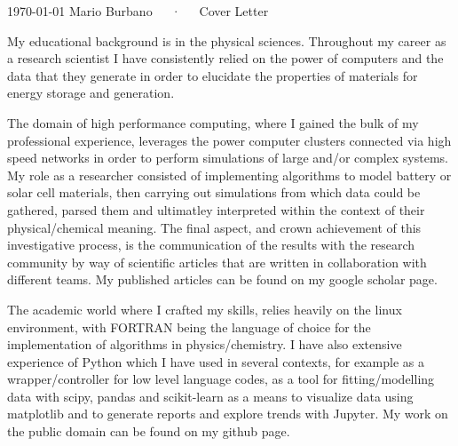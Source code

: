 \documentclass[11pt, a4paper]{awesome-cv}
\begin{document}
\makecvheader[R]

\makecvfooter
  {\today}
  {Mario Burbano~~~·~~~Cover Letter}
  {}

\makelettertitle

\begin{cvletter}


My educational background is in the physical sciences. Throughout my career as a research scientist I have consistently relied on the power of computers and the data that they generate in order to elucidate the properties of materials for energy storage and generation.

The domain of high performance computing, where I gained the bulk of my professional experience, leverages the power computer clusters connected via high speed networks in order to perform simulations of large and/or complex systems. My role as a researcher consisted of implementing algorithms to model battery or solar cell materials, then carrying out simulations from which data could be gathered, parsed them and ultimatley interpreted within the context of their physical/chemical meaning. The final aspect, and crown achievement of this investigative process, is the communication of the results with the research community by way of scientific articles that are written in collaboration with different teams. My published articles can be found on my google scholar page.  

The academic world where I crafted my skills, relies heavily on the linux environment, with FORTRAN being the language of choice for the implementation of algorithms in physics/chemistry. I have also extensive experience of Python which I have used in several contexts, for example as a wrapper/controller for low level language codes, as a tool for fitting/modelling data with scipy, pandas and scikit-learn as a means to visualize data using matplotlib and to generate reports and explore trends with Jupyter. My work on the public domain can be found on my github page. 


\end{cvletter}
\end{document}
